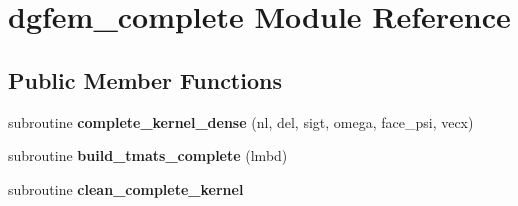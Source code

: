\hypertarget{classdgfem__complete}{\section{dgfem\+\_\+complete Module Reference}
\label{classdgfem__complete}
}
\subsection*{Public Member Functions}
\begin{DoxyCompactItemize}
\item 
\hypertarget{classdgfem__complete_a5b5f10d7d3b7e71ef9643aa857e929e9}{subroutine {\bfseries complete\+\_\+kernel\+\_\+dense} (nl, del, sigt, omega, face\+\_\+psi, vecx)}\label{classdgfem__complete_a5b5f10d7d3b7e71ef9643aa857e929e9}

\item 
\hypertarget{classdgfem__complete_af8acd5d465cc78137c2f5776d2751ab8}{subroutine {\bfseries build\+\_\+tmats\+\_\+complete} (lmbd)}\label{classdgfem__complete_af8acd5d465cc78137c2f5776d2751ab8}

\item 
\hypertarget{classdgfem__complete_ab5b66b5b213dcac7998b55960318c6ca}{subroutine {\bfseries clean\+\_\+complete\+\_\+kernel}}\label{classdgfem__complete_ab5b66b5b213dcac7998b55960318c6ca}

\end{DoxyCompactItemize}
